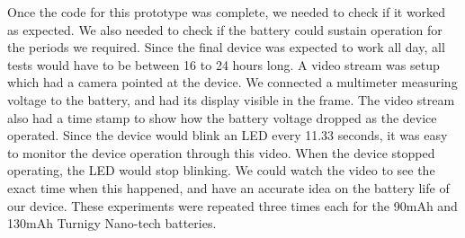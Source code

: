 Once the code for this prototype was complete, we needed to check if it worked as expected.
We also needed to check if the battery could sustain operation for the periods we required.
Since the final device was expected to work all day,
all tests would have to be between 16 to 24 hours long.
A video stream was setup which had a camera pointed at the device.
We connected a multimeter measuring voltage to the battery,
and had its display visible in the frame.
The video stream also had a time stamp to show how the battery voltage dropped as the device operated.
Since the device would blink an LED every 11.33 seconds,
it was easy to monitor the device operation through this video.
When the device stopped operating,
the LED would stop blinking.
We could watch the video to see the exact time when this happened,
and have an accurate idea on the battery life of our device.
These experiments were repeated three times each for the 90mAh and 130mAh Turnigy Nano-tech batteries.

